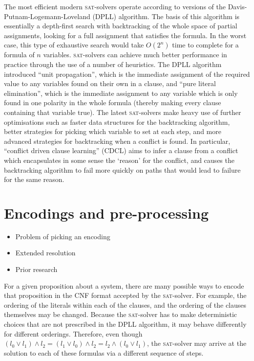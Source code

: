 \documentclass[11pt]{article}
\newcommand{\sat}{\textsc{sat}}
\begin{document}
The most efficient modern \sat{}-solvers operate according to versions of the Davis-Putnam-Logemann-Loveland (DPLL) algorithm. The basis of this algorithm is essentially a depth-first search with backtracking of the whole space of partial assignments, looking for a full assignment that satisfies the formula. In the worst case, this type of exhaustive search would take $O(2^n)$ time to complete for a formula of $n$ variables. \sat{}-solvers can achieve much better performance in practice through the use of a number of heuristics. The DPLL algorithm introduced ``unit propagation'', which is the immediate assignment of the required value to any variables found on their own in a clause, and ``pure literal elimination'', which is the immediate assignment to any variable which is only found in one polarity in the whole formula (thereby making every clause containing that variable true). The latest \sat{}-solvers make heavy use of further optimisations such as faster data structures for the backtracking algorithm, better strategies for picking which variable to set at each step, and more advanced strategies for backtracking when a conflict is found. In particular, ``conflict driven clause learning'' (CDCL) aims to infer a clause from a conflict which encapsulates in some sense the `reason' for the conflict, and causes the backtracking algorithm to fail more quickly on paths that would lead to failure for the same reason.

\section{Encodings and pre-processing}

\begin{itemize}
  \item Problem of picking an encoding
  \item Extended resolution
  \item Prior research
\end{itemize}

For a given proposition about a system, there are many possible ways to encode that proposition in the CNF format accepted by the \sat{}-solver. For example, the ordering of the literals within each of the clauses, and the ordering of the clauses themselves may be changed. Because the \sat{}-solver has to make deterministic choices that are not prescribed in the DPLL algorithm, it may behave differently for different orderings. Therefore, even though $(l_0 \vee l_1) \wedge l_2 = (l_1 \vee l_0) \wedge l_2 = l_2 \wedge (l_0 \vee l_1)$, the \sat{}-solver may arrive at the solution to each of these formulas via a different sequence of steps.
\end{document}
